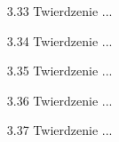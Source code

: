 \begin{enumerate}
    \item [3.33] Twierdzenie ...
    \item [3.34] Twierdzenie ...
    \item [3.35] Twierdzenie ...
    \item [3.36] Twierdzenie ...
    \item [3.37] Twierdzenie ...
\end{enumerate}

%